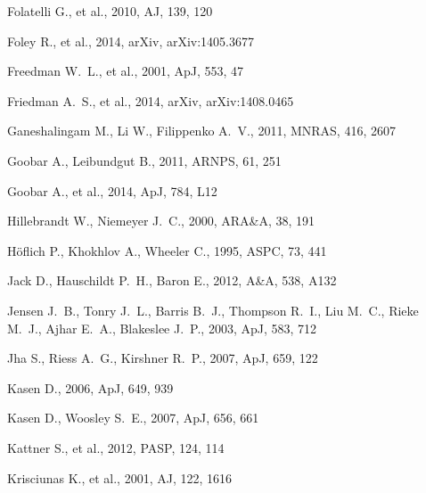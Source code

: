 \begin{thebibliography}{99}
 Folatelli G., et al., 2010, AJ, 139, 120 

 Foley R., et al., 2014, arXiv, 
arXiv:1405.3677

 Freedman W.~L., et al., 2001, ApJ, 553, 47 

 Friedman A.~S., et al., 2014, arXiv, 
arXiv:1408.0465 

 Ganeshalingam M., Li W., Filippenko A.~V., 2011, MNRAS, 416, 2607 


 Goobar A., Leibundgut B., 2011, ARNPS, 61, 251

Goobar A., et al., 2014, ApJ, 784, L12 


 Hillebrandt W., Niemeyer J.~C., 2000, ARA\&A, 38, 191 

 H\" oflich P., Khokhlov A., Wheeler C.,
1995, ASPC, 73, 441 


 Jack D., Hauschildt P.~H., Baron E., 2012, A\&A, 538, A132 

 Jensen J.~B., Tonry J.~L., Barris
B.~J., Thompson R.~I., Liu M.~C., Rieke M.~J., Ajhar E.~A., Blakeslee
J.~P., 2003, ApJ, 583, 712 

 Jha S., Riess A.~G., Kirshner R.~P., 2007, ApJ, 659, 122 

 Kasen 
D., 2006, ApJ, 649, 939

 Kasen D., Woosley S.~E., 2007, ApJ, 656, 661 
 
 Kattner S., et al., 2012, PASP, 124, 114 

 Krisciunas K., et al., 2001, AJ, 122, 1616 


\end{thebibliography}
